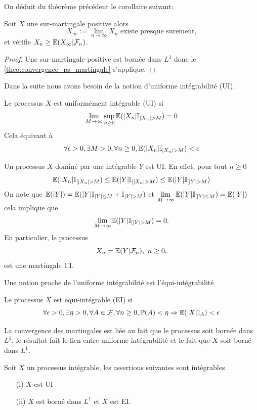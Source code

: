 On déduit du théorème précédent le corollaire suivant:
\begin{coro}
Soit $X$ une sur-martingale positive alors 
$$
X_\infty := \underset{n\rightarrow\infty}{\lim} X_n\text{ existe presque surement,}
$$
et vérifie $X_n \geq  \mathbb{E}(X_\infty|\mathcal{F}_n)$.
\end{coro}
\begin{proof}
Une sur-martingale positive est bornée dans $L^1$ donc le \cref{theo:convergence_ps_martingale} s'applique.
\end{proof}
Dans la suite nous avons besoin de la notion d'uniforme intégrabilité (UI). 
\begin{definition}
Le processus $X$ est uniformément intégrable (UI) si 
$$
\underset{M\rightarrow\infty}{\lim}\,\underset{n\geq 0}{\sup}\,\E(|X_n|\mathbb{I}_{|X_n|>M}) = 0
$$
Cela équivaut à 
$$
\forall \epsilon >0, \exists M >0,\forall n\geq 0,  \E(|X_n|\mathbb{I}_{|X_n|>M}) <\epsilon
$$
\end{definition}
\begin{ex}
Un processus $X$ dominé par une \va intégrable $Y$ est UI. En effet, pour tout $n\geq 0$
$$
\E(|X_n|\mathbb{I}_{[|X_n|>M})\leq \E(|Y|\mathbb{I}_{[|X_n|>M})\leq \E(|Y|\mathbb{I}_{[|Y|>M})
$$
On note que $\E(|Y|) = \E(|Y|\mathbb{I}_{|Y|\leq M} + \mathbb{I}_{|Y|>M})$ et $\underset{M\rightarrow \infty}{\lim}\, \mathbb{E}(|Y|\mathbb{I}_{[|Y|\leq M}) = \mathbb{E}(|Y|)$ cela implique que  
$$
 \underset{M\rightarrow \infty}{\lim}\E(|Y|\mathbb{I}_{[|Y|>M}) = 0.
$$
En particulier, le processus 
$$
X_n = \mathbb{E}(Y|\mathcal{F}_n),\text{ }n\geq 0,
$$
est une martingale UI.
\end{ex}
Une notion proche de l'uniforme intégrabilité est l'équi-intégrabilité
\begin{definition}
Le processus $X$ est equi-intégrable (EI) si 
$$
\forall \epsilon >0, \exists \eta >0, \forall A\in\mathcal{F}, \forall n\geq 0,\mathbb{P}(A)<\eta\Rightarrow \mathbb{E}(|X|\mathbb{I}_A) <\epsilon
$$
\end{definition}
La convergence des martingales est liée au fait que le processus soit bornée dans $L^1$, le résultat fait le lien entre uniforme intégrabilité et le fait que $X$ soit borné dans $L^1$. 
\begin{prop}
Soit $X$ un processus intégrable, les assertions suivantes sont intégrables 
\begin{itemize}
    \item[(i)] $X$ est UI
    \item[(ii)] $X$ est borné dans $L^1$ et $X$ est EI.
\end{itemize}
\end{prop}

